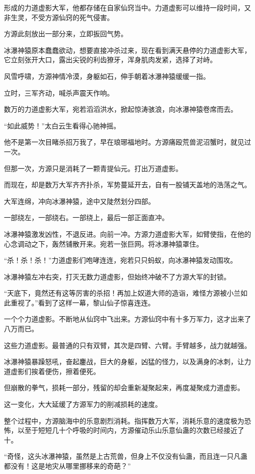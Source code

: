 \begin{this_body}
形成的力道虚影大军，他都存储在自家仙窍当中。力道虚影可以维持一段时间，又非生灵，不受方源仙窍的死气侵害。

方源此刻放出一部分来，立即扳回气势。

冰瀑神猿原本蠢蠢欲动，想要直接冲杀过来，现在看到满天悬停的力道虚影大军，它立刻张开大口，露出尖锐的利齿獠牙，浑身肌肉发紧，选择了对峙。

风雪呼啸，方源神情冷漠，身躯如石，伸手朝着冰瀑神猿缓缓一指。

立时，三军齐动，喊杀声震天作响。

数万的力道虚影大军，宛若滔滔洪水，掀起惊涛骇浪，向冰瀑神猿卷席而去。

“如此威势！”太白云生看得心驰神摇。

他不是第一次目睹杀招万我了，早在琅琊福地时。方源痛殴荒兽泥沼蟹时，就见过一次。

但那一次，方源只是消耗了一颗青提仙元。打出万道虚影。

而现在，却是数万大军齐齐扑杀，军势蔓延开去，自有一股铺天盖地的浩荡之气。

大军连绵，冲向冰瀑神猿，途中又陡然划分四部。

一部绕左，一部绕右。一部绕上，最后一部正面直冲。

冰瀑神猿激发凶性，不退反进。向前一冲。方源力道虚影大军，如臂使指，在他的心念调动之下，轰然铺散开来。宛若一张巨网。将冰瀑神猿罩住。

“杀！杀！杀！”力道虚影们咆哮连连，宛若只只蚂蚁，向冰瀑神猿发动围攻。

冰瀑神猿左冲右突，打灭无数力道虚影，但始终冲破不了方源大军的封锁。

“天底下，竟然还有这等厉害的杀招！再加上奴道大师的造诣，难怪方源被小兰如此重视了。”看到了这样一幕，黎山仙子惊喜连连。

一个个力道虚影。不断地从仙窍中飞出来。方源仙窍中有十多万军力，这才出来了八万而已。

这些力道虚影。最普通的只有双臂，其次是四臂、六臂。手臂越多，战力就越强。

冰瀑神猿暴躁怒吼，奋起鏖战，巨大的身躯，凶猛的怪力，以及满身的冰刺，让力道虚影们挨着便伤，擦着便死。

但崩散的拳气，损耗一部分，残留的却会重新凝聚起来，再度凝聚成力道虚影。

这一变化，大大延缓了方源军力的削减损耗的速度。

整个过程中，方源脑海中的乐意剧烈消耗。指挥数万大军，消耗乐意的速度极为恐怖，以至于短短几十个呼吸的时间内，方源催动乐山乐意仙蛊的次数已经接近了十。

“奇怪，这头冰瀑神猿，虽然是上古荒兽，但身上不仅没有仙蛊，而且连一只凡蛊都没有！这是地灾从哪里挪移来的奇葩？”


\end{this_body}
